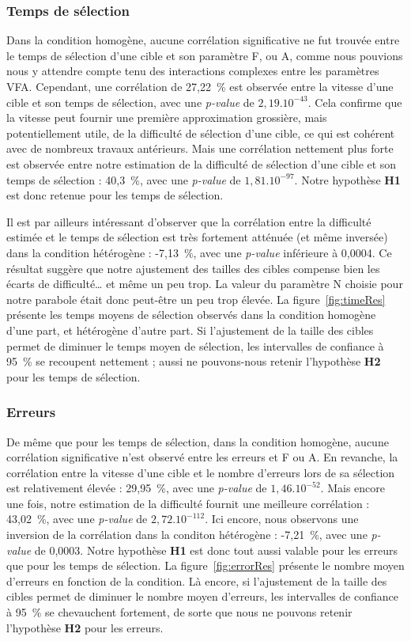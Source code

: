 	\subsubsection{Temps de sélection}
	Dans la condition homogène, aucune corrélation significative ne fut trouvée entre le temps de sélection d'une cible et son paramètre F, ou A, comme nous pouvions nous y attendre compte tenu des interactions complexes entre les paramètres VFA. Cependant, une corrélation de 27,22~\%{} est observée entre la vitesse d'une cible et son temps de sélection, avec une \emph{p-value} de $2,19.10^{-43}$. Cela confirme que la vitesse peut fournir une première approximation grossière, mais potentiellement utile, de la difficulté de sélection d'une cible, ce qui est cohérent avec de nombreux travaux antérieurs. Mais une corrélation nettement plus forte est observée entre notre estimation de la difficulté de sélection d'une cible et son temps de sélection : 40,3~\%{}, avec une \emph{p-value} de $1,81.10^{-97}$. Notre hypothèse \textbf{H1} est donc retenue pour les temps de sélection.
	
	Il est par ailleurs intéressant d'observer que la corrélation entre la difficulté estimée et le temps de sélection est très fortement atténuée (et même inversée) dans la condition hétérogène : -7,13~\%{}, avec une \emph{p-value} inférieure à 0,0004. Ce résultat suggère que notre ajustement des tailles des cibles compense bien les écarts de difficulté\ldots{} et même un peu trop. La valeur du paramètre N choisie pour notre parabole était donc peut-être un peu trop élevée. La figure~\ref{fig:timeRes} présente les temps moyens de sélection observés dans la condition homogène d'une part, et hétérogène d'autre part. Si l'ajustement de la taille des cibles permet de diminuer le temps moyen de sélection, les intervalles de confiance à 95~\%{} se recoupent nettement ; aussi ne pouvons-nous retenir l'hypothèse \textbf{H2} pour les temps de sélection.
	
	\subsubsection{Erreurs}
	De même que pour les temps de sélection, dans la condition homogène, aucune corrélation significative n'est observé entre les erreurs et F ou A. En revanche, la corrélation entre la vitesse d'une cible et le nombre d'erreurs lors de sa sélection est relativement élevée : 29,95~\%{}, avec une \emph{p-value} de $1,46.10^{-52}$. Mais encore une fois, notre estimation de la difficulté fournit une meilleure corrélation : 43,02~\%{}, avec une \emph{p-value} de $2,72.10^{-112}$. Ici encore, nous observons une inversion de la corrélation dans la conditon hétérogène : -7,21~\%{}, avec une \emph{p-value} de 0,0003. Notre hypothèse \textbf{H1} est donc tout aussi valable pour les erreurs que pour les temps de sélection. La figure~\ref{fig:errorRes} présente le nombre moyen d'erreurs en fonction de la condition. Là encore, si l'ajustement de la taille des cibles permet de diminuer le nombre moyen d'erreurs, les intervalles de confiance à 95~\%{} se chevauchent fortement, de sorte que nous ne pouvons retenir l'hypothèse \textbf{H2} pour les erreurs.
	
